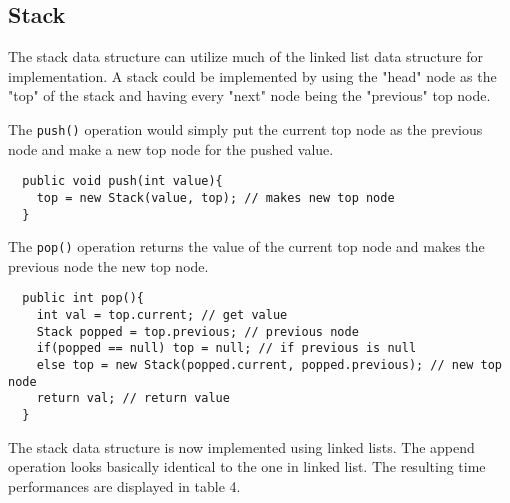 \documentclass[a4paper,11pt]{article}
\begin{document}
\subsection*{Stack}

The stack data structure can utilize much of the linked list data 
structure for implementation. A stack could be implemented by using 
the "head" node as the "top" of the stack and having every "next" node 
being the "previous" top node.

The {\tt push()} operation would simply put the current top node as 
the previous node and make a new top node for the pushed value. 

\begin{verbatim}
  public void push(int value){
    top = new Stack(value, top); // makes new top node
  }
\end{verbatim}

The {\tt pop()} operation returns the value of the current top node
and makes the previous node the new top node.

\begin{verbatim}
  public int pop(){
    int val = top.current; // get value
    Stack popped = top.previous; // previous node
    if(popped == null) top = null; // if previous is null
    else top = new Stack(popped.current, popped.previous); // new top node
    return val; // return value
  }
\end{verbatim}

The stack data structure is now implemented using linked lists. The
append operation looks basically identical to the one in linked list.
The resulting time performances are displayed in table 4. 
\end{document}
